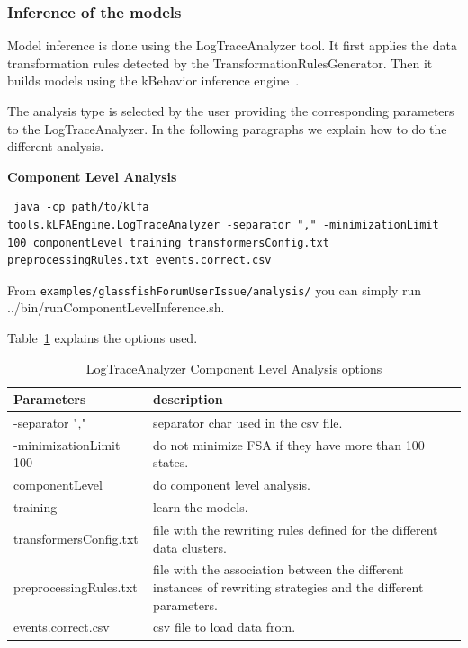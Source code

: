 \subsubsection{Inference of the models}

Model inference is done using the LogTraceAnalyzer tool. It first
applies the data transformation rules detected by the
TransformationRulesGenerator. Then it builds models using the
kBehavior inference engine~\cite{Mariani:COTS:IEEES:2007}.

The analysis type is selected by the user providing the corresponding
parameters to the LogTraceAnalyzer. In the following paragraphs we
explain how to do the different analysis.


\textbf{Component Level Analysis}

\begin{verbatim}
 java -cp path/to/klfa
tools.kLFAEngine.LogTraceAnalyzer -separator "," -minimizationLimit
100 componentLevel training transformersConfig.txt
preprocessingRules.txt events.correct.csv
\end{verbatim}

From \texttt{examples/glassfishForumUserIssue/analysis/} you can simply run
../bin/runComponentLevelInference.sh.

Table~\ref{clat} explains the options used.

\begin{table}
 \begin{tabular}{|p{6cm}|p{4cm}|}
 \hline
Parameters&description\\
\hline
-separator ","&separator char used in the csv file.\\
\hline
-minimizationLimit 100&do not minimize FSA if they have more than 100
states.\\
\hline
componentLevel&do component level analysis.\\
\hline
training&learn the models.\\
\hline
transformersConfig.txt&file with the rewriting rules defined for the
different data clusters.\\
\hline
preprocessingRules.txt&file with the association between the
different instances of rewriting strategies and the different
parameters.\\
\hline
events.correct.csv&csv file to load data from.\\
\hline
\end{tabular}
\label{clat}
\caption{LogTraceAnalyzer Component Level Analysis options}
\end{table}


